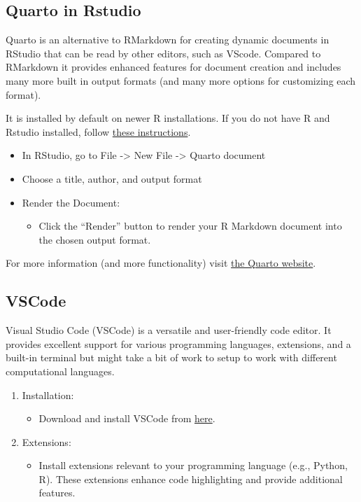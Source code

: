 \documentclass[
  letterpaper,
  DIV=11,
  numbers=noendperiod]{scrreprt}
\providecommand{\tightlist}{%
  \setlength{\itemsep}{0pt}\setlength{\parskip}{0pt}}\usepackage{longtable,booktabs,array}
\begin{document}
\subsection{Quarto in Rstudio}\label{quarto-in-rstudio}

Quarto is an alternative to RMarkdown for creating dynamic documents in
RStudio that can be read by other editors, such as VScode. Compared to
RMarkdown it provides enhanced features for document creation and
includes many more built in output formats (and many more options for
customizing each format).

It is installed by default on newer R installations. If you do not have
R and Rstudio installed, follow
\href{https://rstudio-education.github.io/hopr/starting.html}{these
instructions}.

\begin{itemize}
\tightlist
\item
  In RStudio, go to File -\textgreater{} New File -\textgreater{} Quarto
  document
\item
  Choose a title, author, and output format
\item
  Render the Document:

  \begin{itemize}
  \tightlist
  \item
    Click the ``Render'' button to render your R Markdown document into
    the chosen output format.
  \end{itemize}
\end{itemize}

For more information (and more functionality) visit
\href{https://quarto.org/docs/get-started/hello/rstudio.html}{the Quarto
website}.

\subsection{VSCode}\label{vscode}

Visual Studio Code (VSCode) is a versatile and user-friendly code
editor. It provides excellent support for various programming languages,
extensions, and a built-in terminal but might take a bit of work to
setup to work with different computational languages.

\begin{enumerate}
\def\labelenumi{\arabic{enumi}.}
\tightlist
\item
  Installation:

  \begin{itemize}
  \tightlist
  \item
    Download and install VSCode from
    \href{https://code.visualstudio.com/}{here}.
  \end{itemize}
\item
  Extensions:

  \begin{itemize}
  \tightlist
  \item
    Install extensions relevant to your programming language (e.g.,
    Python, R). These extensions enhance code highlighting and provide
    additional features.
  \end{itemize}
\end{enumerate}
\end{document}
